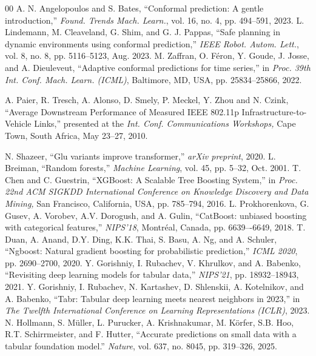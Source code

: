 \documentclass[journal]{IEEEtran}
\begin{document}
\begin{thebibliography}{00}
 A. N. Angelopoulos and S. Bates, ``Conformal prediction: A gentle introduction,'' \emph{Found. Trends Mach. Learn.}, vol. 16, no. 4, pp. 494--591, 2023.
 L. Lindemann, M. Cleaveland, G. Shim, and G. J. Pappas, ``Safe planning in dynamic environments using conformal prediction,'' \emph{IEEE Robot. Autom. Lett.}, vol. 8, no. 8, pp. 5116--5123, Aug. 2023.
 M. Zaffran, O. F\'{e}ron, Y. Goude, J. Josse, and A. Dieuleveut, ``Adaptive conformal predictions for time series,'' in \emph{Proc. 39th Int. Conf. Mach. Learn. (ICML)}, Baltimore, MD, USA, pp. 25834--25866, 2022.


 A. Paier, R. Tresch, A. Alonso, D. Smely, P. Meckel, Y. Zhou and N. Czink, ``Average Downstream Performance of Measured IEEE 802.11p Infrastructure-to-Vehicle Links,'' presented at the \emph{Int. Conf. Communications Workshops,} Cape Town, South Africa, May 23--27, 2010.


 N. Shazeer, ``Glu variants improve transformer,'' \emph{arXiv preprint}, 2020.
 L. Breiman, ``Random forests,'' \emph{Machine Learning}, vol. 45, pp. 5--32, Oct. 2001.
 T. Chen and C. Guestrin, ``XGBoost: A Scalable Tree Boosting System,'' in \emph{Proc. 22nd ACM SIGKDD International Conference on Knowledge Discovery and Data Mining,} San Francisco, California, USA, pp. 785--794, 2016.
 L. Prokhorenkova, G. Gusev, A. Vorobev, A.V. Dorogush, and A. Gulin, ``CatBoost: unbiased boosting with categorical features,'' \emph{NIPS'18}, Montr\'{e}al, Canada, pp. 6639–-6649, 2018.
 T. Duan, A. Anand, D.Y. Ding, K.K. Thai, S. Basu, A. Ng, and A. Schuler, ``Ngboost: Natural gradient boosting for probabilistic prediction,'' \emph{ICML 2020}, pp. 2690--2700, 2020.
 Y. Gorishniy, I. Rubachev, V. Khrulkov, and A. Babenko, ``Revisiting deep learning models for tabular data,'' \emph{NIPS'21}, pp. 18932--18943, 2021.
 Y. Gorishniy, I. Rubachev, N. Kartashev, D. Shlenskii, A. Kotelnikov, and A. Babenko, ``Tabr: Tabular deep learning meets nearest neighbors in 2023,'' in \emph{The Twelfth International Conference on Learning Representations (ICLR)}, 2023.
 N. Hollmann, S. Müller, L. Purucker, A. Krishnakumar, M. Körfer, S.B. Hoo, R.T. Schirrmeister, and F. Hutter, ``Accurate predictions on small data with a tabular foundation model.'' \emph{Nature}, vol. 637, no. 8045, pp. 319--326, 2025.



\end{thebibliography}
\end{document}
